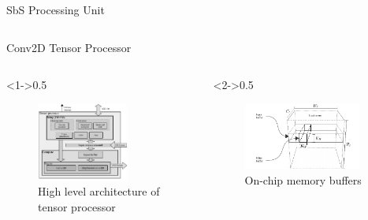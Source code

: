 \begin{frame}{SbS Processing Unit}
\begin{columns}[c]
	\end{columns}
\end{frame}

\begin{frame}{Conv2D Tensor Processor}
	\begin{columns}[c] %
		
		\begin{column}<1->{0.5\textwidth}
			\begin{figure}
				\includegraphics[width=0.7\textwidth]{../chapters/cnn_accelerator/figures/accelerator.pdf} %
				\caption{High level architecture of tensor processor}
			\end{figure}
		\end{column}
		
		\begin{column}<2->{0.5\textwidth}
			\begin{figure}
				\includegraphics[width=0.9\textwidth]{../chapters/cnn_accelerator/figures/accelerator_buffers.pdf} %
				\caption{ On-chip memory buffers}
			\end{figure}
		\end{column}
		
	\end{columns}
\end{frame}

